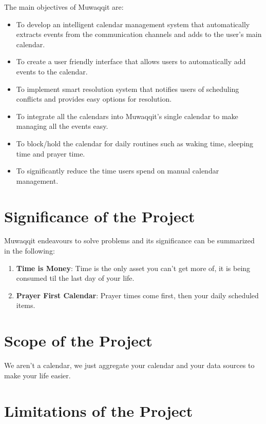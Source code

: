 \documentclass[12pt,a4paper]{article}
\begin{document}
The main objectives of Muwaqqit are:

\begin{itemize}
    \item To develop an intelligent calendar management system that automatically extracts events from the communication channels and adds to the user's main calendar.
    \item To create a user friendly interface that allows users to automatically add events to the calendar.
    \item To implement smart resolution system that notifies users of scheduling conflicts and provides easy options for resolution.
    \item To integrate all the calendars into Muwaqqit's single calendar to make managing all the events easy.
    \item To block/hold the calendar for daily routines such as waking time, sleeping time and prayer time.
    \item To significantly reduce the time users spend on manual calendar management.
\end{itemize}

\section{Significance of the Project}

Muwaqqit endeavours to solve problems and its significance can be summarized in the following:

\begin{enumerate}
    \item \textbf{Time is Money}: Time is the only asset you can't get more of, it is being consumed til the last day of your life.
    \item \textbf{Prayer First Calendar}: Prayer times come first, then your daily scheduled items.
\end{enumerate}

\section{Scope of the Project}

We aren't a calendar, we just aggregate your calendar and your data sources to make your life easier.

\section{Limitations of the Project}
\end{document}
